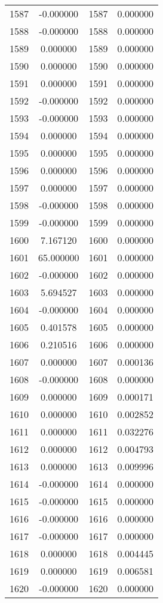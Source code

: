 \documentclass[12pt]{article}
\begin{document}
\begin{longtable}{@{}cccc@{}}
1587 & -0.000000 & 1587 & 0.000000 \\
1588 & -0.000000 & 1588 & 0.000000 \\
1589 & 0.000000 & 1589 & 0.000000 \\
1590 & 0.000000 & 1590 & 0.000000 \\
1591 & 0.000000 & 1591 & 0.000000 \\
1592 & -0.000000 & 1592 & 0.000000 \\
1593 & -0.000000 & 1593 & 0.000000 \\
1594 & 0.000000 & 1594 & 0.000000 \\
1595 & 0.000000 & 1595 & 0.000000 \\
1596 & 0.000000 & 1596 & 0.000000 \\
1597 & 0.000000 & 1597 & 0.000000 \\
1598 & -0.000000 & 1598 & 0.000000 \\
1599 & -0.000000 & 1599 & 0.000000 \\
1600 & 7.167120 & 1600 & 0.000000 \\
1601 & 65.000000 & 1601 & 0.000000 \\
1602 & -0.000000 & 1602 & 0.000000 \\
1603 & 5.694527 & 1603 & 0.000000 \\
1604 & -0.000000 & 1604 & 0.000000 \\
1605 & 0.401578 & 1605 & 0.000000 \\
1606 & 0.210516 & 1606 & 0.000000 \\
1607 & 0.000000 & 1607 & 0.000136 \\
1608 & -0.000000 & 1608 & 0.000000 \\
1609 & 0.000000 & 1609 & 0.000171 \\
1610 & 0.000000 & 1610 & 0.002852 \\
1611 & 0.000000 & 1611 & 0.032276 \\
1612 & 0.000000 & 1612 & 0.004793 \\
1613 & 0.000000 & 1613 & 0.009996 \\
1614 & -0.000000 & 1614 & 0.000000 \\
1615 & -0.000000 & 1615 & 0.000000 \\
1616 & -0.000000 & 1616 & 0.000000 \\
1617 & -0.000000 & 1617 & 0.000000 \\
1618 & 0.000000 & 1618 & 0.004445 \\
1619 & 0.000000 & 1619 & 0.006581 \\
1620 & -0.000000 & 1620 & 0.000000 \\

\end{longtable}
\end{document}
